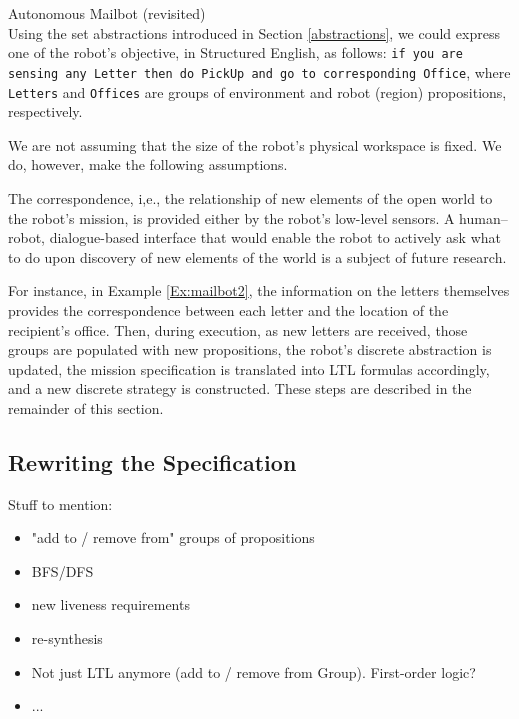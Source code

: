 \begin{myExample}\label{Ex:mailbot2} Autonomous Mailbot (revisited)\\
	Using the set abstractions introduced in Section \ref{abstractions}, we could express one of the robot's objective, in Structured English, as follows: 
\texttt{if you are sensing any Letter then do PickUp and go to corresponding Office}, where \texttt{Letters} and \texttt{Offices} are groups of environment and robot (region) propositions, respectively.
\end{myExample}

We are not assuming that the size of the robot's physical workspace is fixed. We do, however, make the following assumptions.

\begin{myAssumption}
	The correspondence, i,e., the relationship of new elements of the open world to the robot's mission, is provided either by the robot's low-level sensors. A human--robot, dialogue-based interface that would enable the robot to actively ask what to do upon discovery of new elements of the world is a subject of future research.
\end{myAssumption}

For instance, in Example \ref{Ex:mailbot2}, the information on the letters themselves provides the correspondence between each letter and the location of the recipient's office. Then, during execution, as new letters are received, those groups are populated with new propositions, the robot's discrete abstraction is updated, the mission specification is translated into LTL formulas accordingly, and a new discrete strategy is constructed. These steps are described in the remainder of this section.

\subsection{Rewriting the Specification} %

Stuff to mention:
\begin{itemize}
	\item "add to / remove from" groups of propositions
	\item BFS/DFS
	\item new liveness requirements
	\item re-synthesis
	\item Not just LTL anymore (add to / remove from Group). First-order logic?
	\item ...
\end{itemize}

